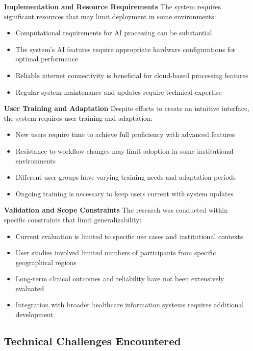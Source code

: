 \textbf{Implementation and Resource Requirements}
The system requires significant resources that may limit deployment in some environments:

\begin{itemize}
    \item Computational requirements for AI processing can be substantial
    \item The system's AI features require appropriate hardware configurations for optimal performance
    \item Reliable internet connectivity is beneficial for cloud-based processing features
    \item Regular system maintenance and updates require technical expertise
\end{itemize}

\textbf{User Training and Adaptation}
Despite efforts to create an intuitive interface, the system requires user training and adaptation:

\begin{itemize}
    \item New users require time to achieve full proficiency with advanced features
    \item Resistance to workflow changes may limit adoption in some institutional environments
    \item Different user groups have varying training needs and adaptation periods
    \item Ongoing training is necessary to keep users current with system updates
\end{itemize}

\textbf{Validation and Scope Constraints}
The research was conducted within specific constraints that limit generalizability:

\begin{itemize}
    \item Current evaluation is limited to specific use cases and institutional contexts
    \item User studies involved limited numbers of participants from specific geographical regions
    \item Long-term clinical outcomes and reliability have not been extensively evaluated
    \item Integration with broader healthcare information systems requires additional development
\end{itemize}

\subsection{Technical Challenges Encountered}

